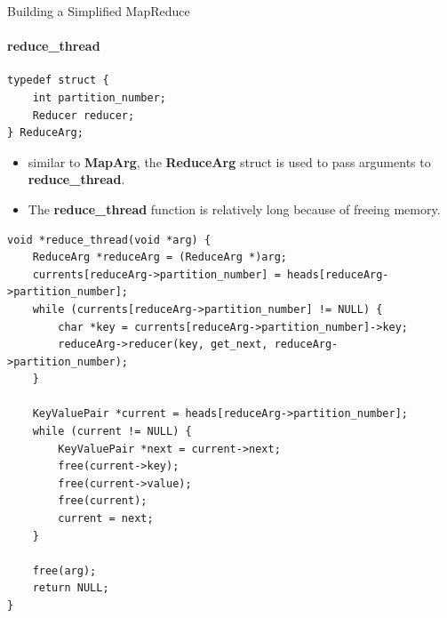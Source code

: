 \documentclass[10pt]{beamer}
\begin{document}
\begin{frame}[fragile]{Building a Simplified MapReduce}
    \framesubtitle{reduce\_thread}
    \begin{minipage}{.35\linewidth}
        \begin{lstlisting}
typedef struct {
    int partition_number;
    Reducer reducer;
} ReduceArg;
                      \end{lstlisting}
        \begin{itemize}
            \item similar to \textbf{MapArg}, the \textbf{ReduceArg} struct is used to pass arguments to \textbf{reduce\_thread}.
            \item The \textbf{reduce\_thread} function is relatively long because of freeing memory.
        \end{itemize}
    \end{minipage}
    \hspace{13pt}
    \begin{minipage}{.60\linewidth}
        \begin{lstlisting}
void *reduce_thread(void *arg) {
    ReduceArg *reduceArg = (ReduceArg *)arg;
    currents[reduceArg->partition_number] = heads[reduceArg->partition_number];
    while (currents[reduceArg->partition_number] != NULL) {
        char *key = currents[reduceArg->partition_number]->key;
        reduceArg->reducer(key, get_next, reduceArg->partition_number);
    }

    KeyValuePair *current = heads[reduceArg->partition_number];
    while (current != NULL) {
        KeyValuePair *next = current->next;
        free(current->key);
        free(current->value);
        free(current);
        current = next;
    }

    free(arg);
    return NULL;
}
                      \end{lstlisting}
    \end{minipage}
\end{frame}
\end{document}
